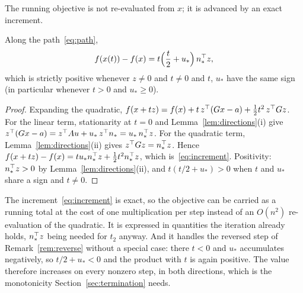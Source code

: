 The running objective is not re-evaluated from $x$; it is advanced by an exact
increment.

\begin{proposition}\label{prop:increment}
Along the path~\eqref{eq:path},
\begin{equation}
  f(x(t)) - f(x) = t\Bigl(\frac{t}{2} + u_*\Bigr)\, n_*^{\top} z ,
  \label{eq:increment}
\end{equation}
which is strictly positive whenever $z \neq 0$ and $t \neq 0$ and $t$, $u_*$ have
the same sign (in particular whenever $t > 0$ and $u_* \ge 0$).
\end{proposition}

\begin{proof}
Expanding the quadratic,
$f(x + tz) = f(x) + t\, z^{\top}(Gx - a) + \tfrac12 t^2\, z^{\top} G z$. For the linear
term, stationarity at $t = 0$ and Lemma~\ref{lem:directions}(i) give
$z^{\top}(Gx - a) = z^{\top} A u + u_*\, z^{\top} n_* = u_*\, n_*^{\top} z$. For the quadratic term,
Lemma~\ref{lem:directions}(ii) gives $z^{\top} G z = n_*^{\top} z$. Hence
$f(x+tz) - f(x) = t u_* n_*^{\top} z + \tfrac12 t^2 n_*^{\top} z$, which
is~\eqref{eq:increment}. Positivity: $n_*^{\top} z > 0$ by
Lemma~\ref{lem:directions}(ii), and $t(t/2 + u_*) > 0$ when $t$ and $u_*$ share a
sign and $t \neq 0$.
\end{proof}

The increment~\eqref{eq:increment} is exact, so the objective can be carried as a
running total at the cost of one multiplication per step instead of an $O(n^2)$
re-evaluation of the quadratic. It is expressed in quantities the iteration
already holds, $n_*^{\top} z$ being needed for $t_2$ anyway. And it handles the
reversed step of Remark~\ref{rem:reverse} without a
special case: there $t < 0$ and $u_*$ accumulates negatively, so
$t/2 + u_* < 0$ and the product with $t$ is again positive. The value therefore
increases on every nonzero step, in both directions, which is the monotonicity
Section~\ref{sec:termination} needs.

